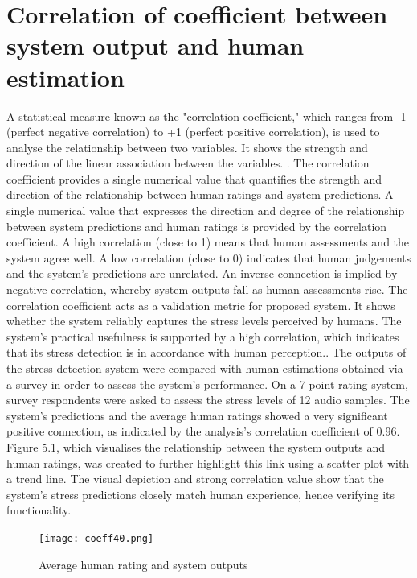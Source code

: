 \documentclass[Arial,12pt,openright,twoside]{book}
\begin{document}
    \section{Correlation of coefficient between system output and human estimation}
    A statistical measure known as the "correlation coefficient," which ranges from -1 (perfect negative correlation) to +1 (perfect positive correlation), is used to analyse the relationship between two variables. It shows the strength and direction of the linear association between the variables. \cite{schober2018correlation}. The correlation coefficient provides a single numerical value that quantifies the strength and direction of the relationship between human ratings and system predictions. A single numerical value that expresses the direction and degree of the relationship between system predictions and human ratings is provided by the correlation coefficient. A high correlation (close to 1) means that human assessments and the system agree well. A low correlation (close to 0) indicates that human judgements and the system's predictions are unrelated. An inverse connection is implied by negative correlation, whereby system outputs fall as human assessments rise.  The correlation coefficient acts as a validation metric for proposed system. It shows whether the system reliably captures the stress levels perceived by humans. The system's practical usefulness is supported by a high correlation, which indicates that its stress detection is in accordance with human perception.. The outputs of the stress detection system were compared with human estimations obtained via a survey in order to assess the system's performance. On a 7-point rating system, survey respondents were asked to assess the stress levels of 12 audio samples. The system's predictions and the average human ratings showed a very significant positive connection, as indicated by the analysis's correlation coefficient of 0.96. Figure 5.1, which visualises the relationship between the system outputs and human ratings, was created to further highlight this link using a scatter plot with a trend line. The visual depiction and strong correlation value show that the system's stress predictions closely match human experience, hence verifying its functionality.
    \vspace{10pt} %
\begin{figure}[H]
    \centering
    \texttt{[image: coeff40.png]}
    \caption{Average human rating and system outputs}
    \label{fig:system_architecture}
\end{figure}
\vspace{10pt} %
\end{document}
